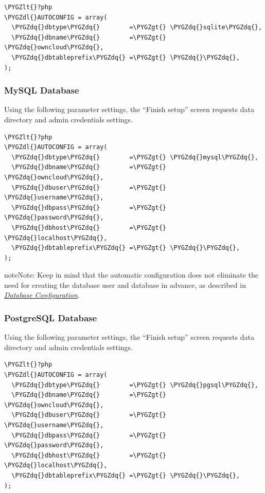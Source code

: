 \documentclass[letterpaper,10pt,english]{sphinxmanual}
\def\PYGZlt{\char`\<}
\def\PYGZgt{\char`\>}
\def\PYGZdl{\char`\$}
\def\PYGZdq{\char`\"}
\begin{document}
\begin{Verbatim}[commandchars=\\\{\}]
\PYGZlt{}?php
\PYGZdl{}AUTOCONFIG = array(
  \PYGZdq{}dbtype\PYGZdq{}        =\PYGZgt{} \PYGZdq{}sqlite\PYGZdq{},
  \PYGZdq{}dbname\PYGZdq{}        =\PYGZgt{} \PYGZdq{}owncloud\PYGZdq{},
  \PYGZdq{}dbtableprefix\PYGZdq{} =\PYGZgt{} \PYGZdq{}\PYGZdq{},
);
\end{Verbatim}


\subsubsection{MySQL Database}
\label{configuration_server/automatic_configuration:mysql-database}
Using the following parameter settings, the ``Finish setup'' screen requests data directory and admin credentials settings.

\begin{Verbatim}[commandchars=\\\{\}]
\PYGZlt{}?php
\PYGZdl{}AUTOCONFIG = array(
  \PYGZdq{}dbtype\PYGZdq{}        =\PYGZgt{} \PYGZdq{}mysql\PYGZdq{},
  \PYGZdq{}dbname\PYGZdq{}        =\PYGZgt{} \PYGZdq{}owncloud\PYGZdq{},
  \PYGZdq{}dbuser\PYGZdq{}        =\PYGZgt{} \PYGZdq{}username\PYGZdq{},
  \PYGZdq{}dbpass\PYGZdq{}        =\PYGZgt{} \PYGZdq{}password\PYGZdq{},
  \PYGZdq{}dbhost\PYGZdq{}        =\PYGZgt{} \PYGZdq{}localhost\PYGZdq{},
  \PYGZdq{}dbtableprefix\PYGZdq{} =\PYGZgt{} \PYGZdq{}\PYGZdq{},
);
\end{Verbatim}

\begin{notice}{note}{Note:}
Keep in mind that the automatic configuration does not eliminate the need for
creating the  database user and database in advance, as described in
{\hyperref[configuration_database/linux_database_configuration::doc]{\emph{\emph{Database Configuration}}}}.
\end{notice}


\subsubsection{PostgreSQL Database}
\label{configuration_server/automatic_configuration:postgresql-database}
Using the following parameter settings, the ``Finish setup'' screen requests data directory and admin credentials settings.

\begin{Verbatim}[commandchars=\\\{\}]
\PYGZlt{}?php
\PYGZdl{}AUTOCONFIG = array(
  \PYGZdq{}dbtype\PYGZdq{}        =\PYGZgt{} \PYGZdq{}pgsql\PYGZdq{},
  \PYGZdq{}dbname\PYGZdq{}        =\PYGZgt{} \PYGZdq{}owncloud\PYGZdq{},
  \PYGZdq{}dbuser\PYGZdq{}        =\PYGZgt{} \PYGZdq{}username\PYGZdq{},
  \PYGZdq{}dbpass\PYGZdq{}        =\PYGZgt{} \PYGZdq{}password\PYGZdq{},
  \PYGZdq{}dbhost\PYGZdq{}        =\PYGZgt{} \PYGZdq{}localhost\PYGZdq{},
  \PYGZdq{}dbtableprefix\PYGZdq{} =\PYGZgt{} \PYGZdq{}\PYGZdq{},
);
\end{Verbatim}
\end{document}
